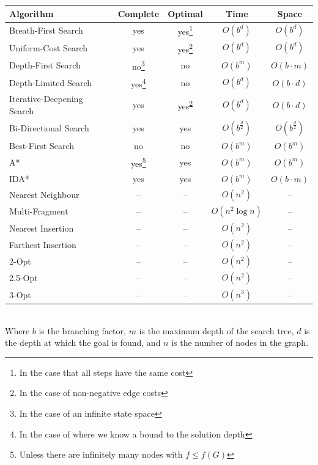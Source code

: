 \documentclass{article}
\begin{document}
\renewcommand{\arraystretch}{1.4}
\begin{tabularx}{\textwidth}{|X|c|c|c|c|}
\hline
\textbf{Algorithm} & \textbf{Complete} & \textbf{Optimal} & \textbf{Time} & \textbf{Space} \\ \hline \hline
Breath-First Search & yes & yes\footnote{In the case that all steps have the same cost} & $O(b^d)$ & $O(b^d)$ \\
Uniform-Cost Search & yes & yes\footnote{\label{note2}In the case of non-negative edge costs} & $O(b^d)$ & $O(b^d)$ \\
Depth-First Search & no\footnote{In the case of an infinite state space} & no & $O(b^m)$ & $O(b \cdot m)$ \\
Depth-Limited Search & yes\footnote{In the case of where we know a bound to the solution depth} & no & $O(b^d)$ & $O(b \cdot d)$ \\
Iterative-Deepening Search & yes & yes\textsuperscript{\ref{note2}} & $O(b^d)$ & $O(b \cdot d)$ \\
Bi-Directional Search & yes & yes & $O(b^\frac{d}{2})$ & $O(b^\frac{d}{2})$ \\
Best-First Search & no & no & $O(b^m)$ & $O(b^m)$ \\
A* & yes\footnote{Unless there are infinitely many nodes with $f \leq f(G)$} & yes & $O(b^m)$ & $O(b^m)$ \\
IDA* & yes & yes & $O(b^m)$ & $O(b \cdot m)$ \\
\hline
Nearest Neighbour & -- & -- & $O(n^2)$ & -- \\
Multi-Fragment & -- & -- & $O(n^2 \log n)$ & -- \\
Nearest Insertion & -- & -- & $O(n^2)$ & -- \\
Farthest Insertion & -- & -- & $O(n^2)$ & -- \\
2-Opt & -- & -- & $O(n^2)$ & -- \\
2.5-Opt & -- & -- & $O(n^2)$ & -- \\
3-Opt & -- & -- & $O(n^3)$ & -- \\
\hline
\end{tabularx}
\vspace{.2cm} \\
Where $b$ is the branching factor, $m$ is the maximum depth of the search tree, $d$ is the depth at which the goal is found, and $n$ is the number of nodes in the graph.
\end{document}
